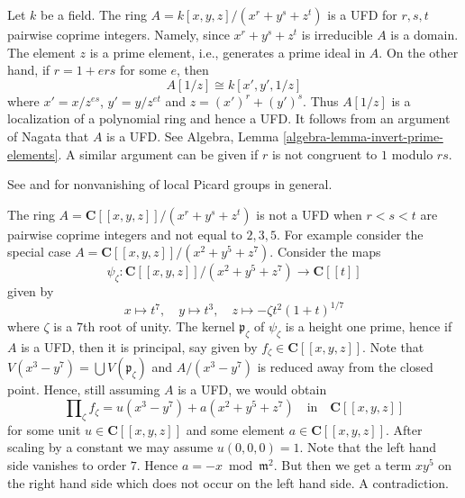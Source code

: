 \begin{example}
\label{example-factorial}
\begin{reference}
\cite[4(c)]{Samuel-UFD}
\end{reference}
Let $k$ be a field. The ring $A = k[x, y, z]/(x^r + y^s + z^t)$
is a UFD for $r, s, t$ pairwise coprime integers. Namely, since
$x^r + y^s + z^t$ is irreducible $A$ is a domain. The element $z$
is a prime element, i.e., generates a prime ideal in $A$.
On the other hand, if $r = 1 + ers$ for some $e$, then
$$
A[1/z] \cong k[x', y', 1/z]
$$
where $x' = x/z^{es}$, $y' = y/z^{et}$ and $z = (x')^r + (y')^s$.
Thus $A[1/z]$ is a localization of a polynomial ring and hence
a UFD. It follows from an argument of Nagata that $A$ is a UFD.
See Algebra, Lemma \ref{algebra-lemma-invert-prime-elements}.
A similar argument can be given if $r$ is not congruent to $1$
modulo $rs$.
\end{example}

\begin{example}
\label{example-completion-not-factorial}
\begin{reference}
See \cite{Brieskorn} and \cite{Lipman-rational} for nonvanishing of
local Picard groups in general.
\end{reference}
The ring $A = \mathbf{C}[[x, y, z]]/(x^r + y^s + z^t)$
is not a UFD when $r < s < t$ are pairwise coprime integers
and not equal to $2, 3, 5$. For example consider the special
case $A = \mathbf{C}[[x, y, z]]/(x^2 + y^5 + z^7)$.
Consider the maps
$$
\psi_\zeta : \mathbf{C}[[x, y, z]]/(x^2 + y^5 + z^7) \to \mathbf{C}[[t]]
$$
given by
$$
x \mapsto t^7,\quad
y \mapsto t^3,\quad
z \mapsto -\zeta t^2(1 + t)^{1/7}
$$
where $\zeta$ is a $7$th root of unity. The kernel $\mathfrak p_\zeta$
of $\psi_\zeta$ is a height one prime, hence if $A$ is a UFD, then
it is principal, say given by $f_\zeta \in \mathbf{C}[[x, y, z]]$.
Note that $V(x^3 - y^7) = \bigcup V(\mathfrak p_\zeta)$
and $A/(x^3 - y^7)$ is reduced away from the closed point. Hence,
still assuming $A$ is a UFD, we would obtain
$$
\prod\nolimits_\zeta f_\zeta = u(x^3 - y^7) + a(x^2 + y^5 + z^7)
\quad\text{in}\quad
\mathbf{C}[[x, y, z]]
$$
for some unit $u \in \mathbf{C}[[x, y, z]]$ and some
element $a \in \mathbf{C}[[x, y, z]]$. After scaling by a constant
we may assume $u(0, 0, 0) = 1$. Note that the left hand side vanishes to
order $7$. Hence $a = - x \bmod \mathfrak m^2$. But then we get a term
$xy^5$ on the right hand side which does not occur on the left
hand side. A contradiction.
\end{example}

